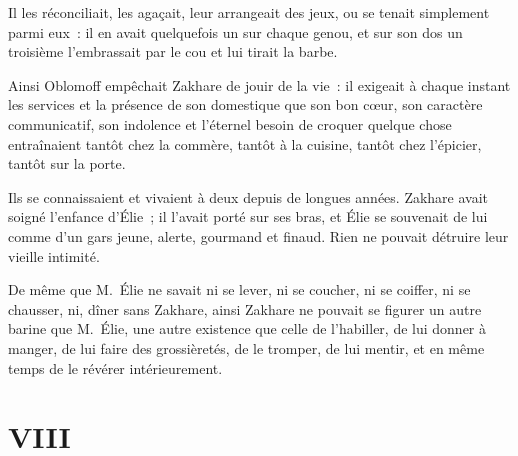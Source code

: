 \documentclass[french,twoside]{book} %
\begin{document}
Il les réconciliait, les agaçait, leur arrangeait des jeux, ou se tenait simplement parmi eux : il en avait quelquefois un sur chaque genou, et sur son dos un troisième l’embrassait par le cou et lui tirait la barbe.\par
Ainsi Oblomoff empêchait Zakhare de jouir de la vie : il exigeait à chaque instant les services et la présence de son domestique que son bon cœur, son caractère communicatif, son indolence et l’éternel besoin de croquer quelque chose entraînaient tantôt chez la commère, tantôt à la cuisine, tantôt chez l’épicier, tantôt sur la porte.\par
Ils se connaissaient et vivaient à deux depuis de longues années. Zakhare avait soigné l’enfance d’Élie ; il l’avait porté sur ses bras, et Élie se souvenait de lui comme d’un gars jeune, alerte, gourmand et finaud. Rien ne pouvait détruire leur vieille intimité.\par
De même que M. Élie ne savait ni se lever, ni se coucher, ni se coiffer, ni se chausser, ni, dîner sans Zakhare, ainsi Zakhare ne pouvait se figurer un autre barine que M. Élie, une autre existence que celle de l’habiller, de lui donner à manger, de lui faire des grossièretés, de le tromper, de lui mentir, et en même temps de le révérer intérieurement.
\section[{VIII}]{VIII}\renewcommand{\leftmark}{VIII}
\end{document}
